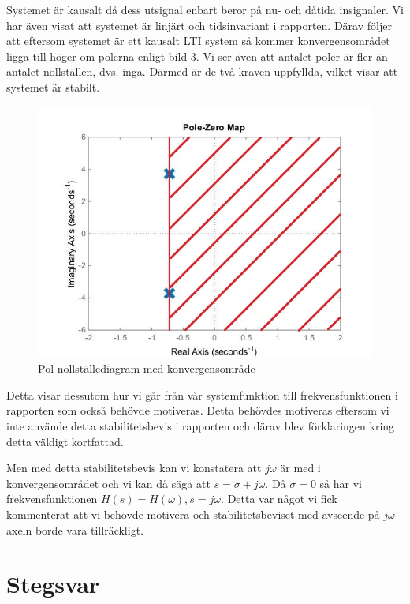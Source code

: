 \documentclass[10pt,a4paper]{article}
\begin{document}
Systemet är kausalt då dess utsignal enbart beror på nu- och dåtida insignaler. Vi har även visat att systemet är linjärt och tidsinvariant i rapporten. Därav följer att eftersom systemet är ett kausalt LTI system så kommer konvergensområdet ligga till höger om polerna enligt bild 3. Vi ser även att antalet poler är fler än antalet nollställen, dvs. inga. Därmed är de två kraven uppfyllda, vilket visar att systemet är stabilt.

\begin{figure}[h]
\begin{center}
\includegraphics[scale=0.6]{nolpol-diagram_konvergens}
\caption{Pol-nollställediagram med konvergensområde}
\end{center}
\end{figure}

Detta visar dessutom hur vi går från vår systemfunktion till frekvensfunktionen i rapporten som också behövde motiveras. Detta behövdes motiveras eftersom vi inte använde detta stabilitetsbevis i rapporten och därav blev förklaringen kring detta väldigt kortfattad. 

Men med detta stabilitetsbevis kan vi konstatera att $j\omega$ är med i konvergensområdet och vi kan då säga att $s = \sigma + j\omega$. Då $\sigma = 0$ så har vi frekvensfunktionen $H(s) = H(\omega), s = j\omega$. Detta var något vi fick kommenterat att vi behövde motivera och stabilitetsbeviset med avseende på $j\omega$-axeln borde vara tillräckligt.
\newpage
\section{Stegsvar}
\end{document}
